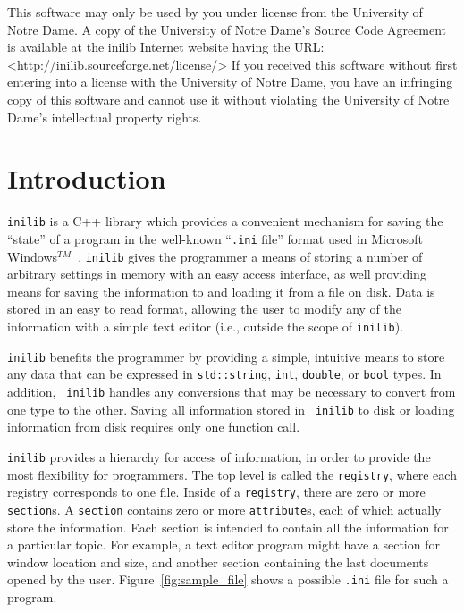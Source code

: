%
This software may only be used by you under license from the
University of Notre Dame.  A copy of the University of Notre Dame's
Source Code Agreement is available at the inilib Internet website
having the URL: <http://inilib.sourceforge.net/license/> If you
received this software without first entering into a license with the
University of Notre Dame, you have an infringing copy of this software
and cannot use it without violating the University of Notre Dame's
intellectual property rights.
% 
%

\section{Introduction}
\label{sec:Introduction}

{\tt inilib} is a C++\cite{cpp98} library which provides a convenient
mechanism for saving the ``state'' of a program in the well-known
``{\tt .ini} file'' format used in Microsoft
Windows$^{TM}$~\cite{MS-WIN}.  {\tt inilib} gives the programmer a
means of storing a number of arbitrary settings in memory with an easy
access interface, as well providing means for saving the information
to and loading it from a file on disk.  Data is stored in an easy to
read format, allowing the user to modify any of the information with a
simple text editor (i.e., outside the scope of {\tt inilib}).

{\tt inilib} benefits the programmer by providing a simple, intuitive
means to store any data that can be expressed in {\tt std::string},
{\tt int}, {\tt double}, or {\tt bool} types.  In addition, {\tt
  inilib} handles any conversions that may be necessary to convert
from one type to the other.  Saving all information stored in {\tt
  inilib} to disk or loading information from disk requires only one
function call.

{\tt inilib} provides a hierarchy for access of information, in order
to provide the most flexibility for programmers.  The top level is
called the {\tt registry}, where each registry corresponds to one
file.  Inside of a {\tt registry}, there are zero or more {\tt
  section}s.  A {\tt section} contains zero or more {\tt attribute}s,
each of which actually store the information.  Each section is
intended to contain all the information for a particular topic.  For
example, a text editor program might have a section for window
location and size, and another section containing the last documents
opened by the user.  Figure~\ref{fig:sample_file} shows a possible
{\tt .ini} file for such a program.

